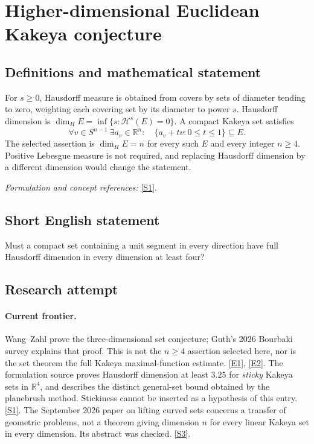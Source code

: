 \documentclass[11pt,a4paper]{article}
\newcommand{\R}{\mathbb{R}}
\newcommand{\sref}[2]{\hyperlink{source:#1:#2}{[S#2]}}
\newcommand{\eref}[2]{\hyperlink{extra:#1:#2}{[E#2]}}
\newif\ifshowcatalogue
\newcommand{\cataloguescope}[1]{\ifshowcatalogue
 \paragraph{Exact scope in the supplied catalogue.}
 \begin{quote}\small #1\end{quote}\fi}
\numberwithin{equation}{section}
\begin{document}
\setcounter{section}{37}
\clearpage
\section{\texorpdfstring{Higher-dimensional Euclidean Kakeya conjecture}{Higher-dimensional Euclidean Kakeya conjecture}}\label{38}
\subsection{Definitions and mathematical statement}
For $s\ge0$, Hausdorff measure is obtained from covers by sets of diameter tending to zero, weighting each covering set by its diameter to power $s$. Hausdorff dimension is $\dim_H E=\inf\{s:\mathcal H^s(E)=0\}$. A compact Kakeya set satisfies
\[
 \forall v\in S^{n-1}\ \exists a_v\in\R^n:\quad
 \{a_v+tv:0\le t\le1\}\subseteq E.
\]
The selected assertion is $\dim_H E=n$ for every such $E$ and every integer $n\ge4$. Positive Lebesgue measure is not required, and replacing Hausdorff dimension by a different dimension would change the statement.
\par\smallskip\textit{Formulation and concept references:} \sref{38}{1}.
\cataloguescope{Prove or disprove that for every integer n >= 4, every compact set E in R\textasciicircum{}n that contains a unit line segment in every direction has Hausdorff dimension n.}
\subsection{Short English statement}
Must a compact set containing a unit segment in every direction have full Hausdorff dimension in every dimension at least four?
\subsection{Research attempt}

\paragraph{Current frontier.}
Wang--Zahl prove the three-dimensional set conjecture; Guth's 2026 Bourbaki
survey explains that proof. This is not the $n\ge4$ assertion selected here,
nor is the set theorem the full Kakeya maximal-function estimate.
\eref{38}{1}, \eref{38}{2}. The formulation source proves Hausdorff dimension
at least $3.25$ for \emph{sticky} Kakeya sets in $\R^4$, and describes the
distinct general-set bound obtained by the planebrush method. Stickiness
cannot be inserted as a hypothesis of this entry. \sref{38}{1}.
The September 2026 paper on lifting curved sets concerns a transfer of
geometric problems, not a theorem giving dimension $n$ for every linear
Kakeya set in every dimension. Its abstract was checked. \sref{38}{3}.
\end{document}
